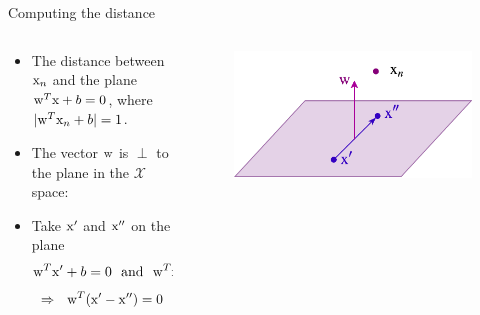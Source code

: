 \begin{frame}{Computing the distance}
\begin{columns}
\begin{column}{6cm}
\begin{itemize}
\item The distance between ${\rm x}_n$ and the plane ${\rm w}^T{\rm x}+b=0$, where $|{\rm w}^{T}{\rm x}_n+b|=1$.
\item The vector ${\rm w}$ is $\perp$ to the plane in the $\mathcal{X}$ space:
\item Take ${\rm x}'$ and ${\rm x}''$ on the plane
\[{\rm w}^T{\rm x}'+b=0~~\text{and}~~{\rm w}^T{\rm x}''+b=0\]
\[\Rightarrow~~ {\rm w}^T({\rm x}'-{\rm x}'')=0\]
\end{itemize}
\end{column}
\begin{column}{5cm}
\begin{figure}
\includegraphics[scale=0.15]{Figures/SVM01.png}
\end{figure}
\end{column}
\end{columns}
\end{frame}

